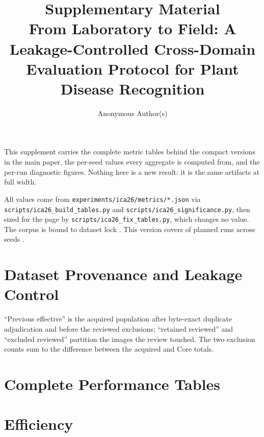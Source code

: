\documentclass[runningheads]{llncs}
\begin{document}
\title{Supplementary Material\\
\large From Laboratory to Field: A Leakage-Controlled Cross-Domain
Evaluation Protocol for Plant Disease Recognition}

\author{Anonymous Author(s)}

\maketitle

\noindent
This supplement carries the complete metric tables behind the compact versions
in the main paper, the per-seed values every aggregate is computed from, and the
per-run diagnostic figures. Nothing here is a new result: it is the same
artifacts at full width.

All values come from \texttt{experiments/ica26/metrics/*.json} via
\texttt{scripts/ica26\_build\_tables.py} and
\texttt{scripts/ica26\_significance.py}, then sized for the page by
\texttt{scripts/ica26\_fix\_tables.py}, which changes no value. The corpus is
bound to dataset lock \LockDigest{}. This version covers \NRunsDone{} of
\NRunsPlanned{} planned runs across seeds \SeedList{}.

\section{Dataset Provenance and Leakage Control}



\noindent
``Previous effective'' is the acquired population after byte-exact duplicate
adjudication and before the reviewed exclusions; ``retained reviewed'' and
``excluded reviewed'' partition the images the review touched. The two exclusion
counts sum to the difference between the acquired and Core totals.

\section{Complete Performance Tables}






\section{Efficiency}
\end{document}
